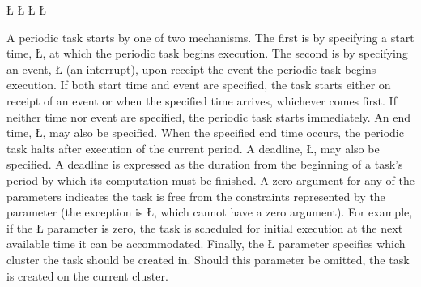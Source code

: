 \documentclass[openright,twoside]{report}
\begin{document}
\L{\LB{}}
\L{\LB{}}
\L{\LB{}}
\L{\LB{\};}}
\endlgrinde\LGend
{}%
%

A periodic task starts by one of two mechanisms.
The first is by specifying a start time, \LGinlinetrue\LGbegin\lgrinde\L{}\endlgrinde\LGend{}, at which the periodic task begins execution.
The second is by specifying an event, \LGinlinetrue\LGbegin\lgrinde\L{}\endlgrinde\LGend{} (an interrupt), upon receipt the event the periodic task begins execution.
If both start time and event are specified, the task starts either on receipt of an event or when the specified time arrives, whichever comes first.
If neither time nor event are specified, the periodic task starts immediately.
An end time, \LGinlinetrue\LGbegin\lgrinde\L{}\endlgrinde\LGend{}, may also be specified.
When the specified end time occurs, the periodic task halts after execution of the current period.
A deadline, \LGinlinetrue\LGbegin\lgrinde\L{}\endlgrinde\LGend{}, may also be specified.
A deadline is expressed as the duration from the beginning of a task's period by which its computation must be finished.
A zero argument for any of the parameters indicates the task is free from the constraints represented by the parameter (the exception is \LGinlinetrue\LGbegin\lgrinde\L{}\endlgrinde\LGend{}, which cannot have a zero argument).
For example, if the \LGinlinetrue\LGbegin\lgrinde\L{}\endlgrinde\LGend{} parameter is zero, the task is scheduled for initial execution at the next available time it can be accommodated.
Finally, the \LGinlinetrue\LGbegin\lgrinde\L{}\endlgrinde\LGend{} parameter specifies which cluster the task should be created in.
Should this parameter be omitted, the task is created on the current cluster.
\end{document}
